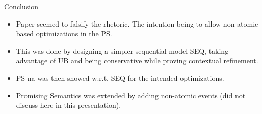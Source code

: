 \documentclass[xcolor=dvipsnames, notes]{beamer}
\begin{document}
    \begin{frame}{Conclusion}

        \begin{itemize}
            \item Paper seemed to falsify the rhetoric. The intention being to allow non-atomic based optimizations in the PS. 
            \item This was done by designing a simpler sequential model SEQ, taking advantage of UB and being conservative while proving contextual refinement. 
            \item PS-na was then showed  w.r.t. SEQ for the intended optimizations.
            \item Promising Semantics was extended by adding non-atomic events (did not discuss here in this presentation).
        \end{itemize}
        
    \end{frame}
\end{document}
